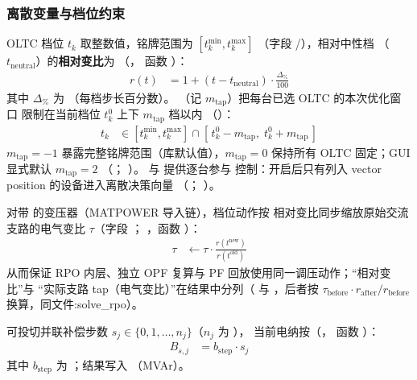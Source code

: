 \subsubsection*{离散变量与档位约束}
OLTC 档位 $t_k$ 取整数值，铭牌范围为 $[t_k^{\min},t_k^{\max}]$
（字段 /），相对中性档 
（$t_{\mathrm{neutral}}$）的\textbf{相对变比}为
（，
函数 ）：
\begin{align*}
r(t) &= 1 + (t - t_{\mathrm{neutral}})\cdot \frac{\Delta_{\%}}{100}
\end{align*}
其中 $\Delta_{\%}$ 为 （每档步长百分数）。
（记 $m_{\mathrm{tap}}$）把每台已选 OLTC 的本次优化窗口
限制在当前档位 $t_k^{0}$ 上下 $m_{\mathrm{tap}}$ 档以内
（）：
\begin{align*}
t_k &\in [t_k^{\min},t_k^{\max}]\cap
        [\,t_k^{0}-m_{\mathrm{tap}},\;t_k^{0}+m_{\mathrm{tap}}\,]
\end{align*}
$m_{\mathrm{tap}}=-1$ 暴露完整铭牌范围（库默认值），$m_{\mathrm{tap}}=0$
保持所有 OLTC 固定；GUI 显式默认 $m_{\mathrm{tap}}=2$
（；
）。
 与  提供逐台参与
控制：开启后只有列入 vector position 的设备进入离散决策向量
（；
）。

对带  的变压器（MATPOWER 导入链），档位动作按
相对变比同步缩放原始交流支路的电气变比 $\tau$（字段 ；
，函数
）：
\begin{align*}
\tau &\leftarrow \tau\cdot \frac{r(t^{\mathrm{new}})}{r(t^{\mathrm{old}})}
\end{align*}
从而保证 RPO 内层、独立 OPF 复算与 PF 回放使用同一调压动作；“相对变比”与
“实际支路 tap（电气变比）”在结果中分列（ 与
，后者按
$\tau_{\mathrm{before}}\cdot r_{\mathrm{after}}/r_{\mathrm{before}}$
换算，同文件:solve\_rpo）。

可投切并联补偿步数 $s_j\in\{0,1,\ldots,n_j\}$（$n_j$ 为 ），
当前电纳按（，
函数 ）：
\begin{align*}
B_{s,j} &= b_{\mathrm{step}}\cdot s_j
\end{align*}
其中 $b_{\mathrm{step}}$ 为 ；结果写入 
（MVAr）。

